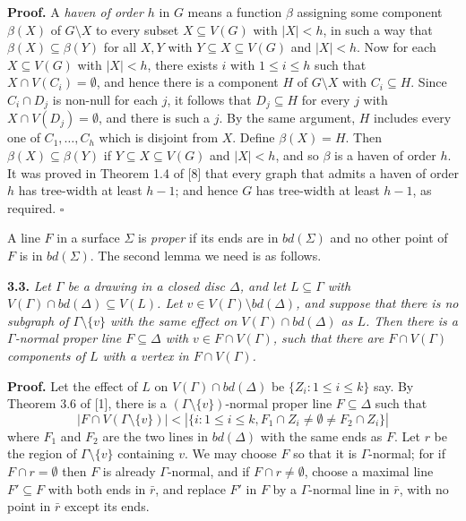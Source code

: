 \textbf{Proof.} A \textit{haven of order $h$} in $G$ means a function $\beta$ assigning some component $\beta(X)$ of $G \setminus X$ to every subset $X \subseteq V(G)$ with $|X| < h$, in such a way that $\beta(X) \subseteq \beta(Y)$ for all $X, Y$ with $Y \subseteq X \subseteq V(G)$ and $|X| < h$. Now for each $X \subseteq V(G)$ with $|X| < h$, there exists $i$ with $1 \le i \le h$ such that $X \cap V(C_i) = \emptyset$, and hence there is a component $H$ of $G \setminus X$ with $C_i \subseteq H$. Since $C_i \cap D_j$ is non-null for each $j$, it follows that $D_j \subseteq H$ for every $j$ with $X \cap V(D_j) = \emptyset$, and there is such a $j$. By the same argument, $H$ includes every one of $C_1, \ldots, C_h$ which is disjoint from $X$. Define $\beta(X) = H$. Then $\beta(X) \subseteq \beta(Y)$ if $Y \subseteq X \subseteq V(G)$ and $|X| < h$, and so $\beta$ is a haven of order $h$. It was proved in Theorem 1.4 of [8] that every graph that admits a haven of order $h$ has tree-width at least $h - 1$; and hence $G$ has tree-width at least $h - 1$, as required. $\square$

A line $F$ in a surface $\Sigma$ is \textit{proper} if its ends are in $bd(\Sigma)$ and no other point of $F$ is in $bd(\Sigma)$. The second lemma we need is as follows.

\textbf{3.3.} \textit{Let $\Gamma$ be a drawing in a closed disc $\Delta$, and let $L \subseteq \Gamma$ with $V(\Gamma) \cap bd(\Delta) \subseteq V(L)$. Let $v \in V(\Gamma) \setminus bd(\Delta)$, and suppose that there is no subgraph of $\Gamma \setminus \{v\}$ with the same effect on $V(\Gamma) \cap bd(\Delta)$ as $L$. Then there is a $\Gamma$-normal proper line $F \subseteq \Delta$ with $v \in F \cap V(\Gamma)$, such that there are $F \cap V(\Gamma)$ components of $L$ with a vertex in $F \cap V(\Gamma)$.}

\textbf{Proof.} Let the effect of $L$ on $V(\Gamma) \cap bd(\Delta)$ be $\{Z_i: 1 \le i \le k\}$ say. By Theorem 3.6 of [1], there is a $(\Gamma \setminus \{v\})$-normal proper line $F \subseteq \Delta$ such that
\begin{equation*}
|F \cap V(\Gamma \setminus \{v\})| < |\{i: 1 \le i \le k, F_1 \cap Z_i \ne \emptyset \ne F_2 \cap Z_i\}|
\end{equation*}
where $F_1$ and $F_2$ are the two lines in $bd(\Delta)$ with the same ends as $F$. Let $r$ be the region of $\Gamma \setminus \{v\}$ containing $v$. We may choose $F$ so that it is $\Gamma$-normal; for if $F \cap r = \emptyset$ then $F$ is already $\Gamma$-normal, and if $F \cap r \ne \emptyset$, choose a maximal line $F' \subseteq F$ with both ends in $\bar{r}$, and replace $F'$ in $F$ by a $\Gamma$-normal line in $\bar{r}$, with no point in $\bar{r}$ except its ends.

